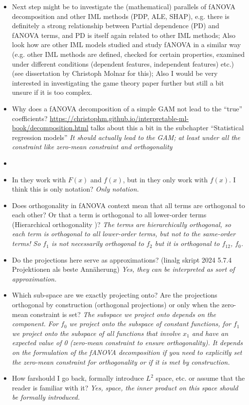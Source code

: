 \begin{itemize}
    \item Next step might be to investigate the (mathematical) parallels of fANOVA decomposition and other IML methods (PDP, ALE, SHAP), e.g. there is definitely a strong relationship between Partial dependence (PD) and fANOVA terms, and PD is itself again related to other IML methods; Also look how are other IML models studied and study fANOVA in a similar way (e.g. other IML methods are defined, checked for certain properties, examined under different conditions (dependent features, independent features) etc.) (see dissertation by Christoph Molnar for this); Also I would be very interested in investigating the game theory paper further \citep{fumagalli2025} but still a bit unsure if it is too complex.
    \item Why does a fANOVA decomposition of a simple GAM not lead to the ``true'' coefficients? \href{https://christophm.github.io/interpretable-ml-book/decomposition.html}{https://christophm.github.io/interpretable-ml-book/decomposition.html} talks about this a bit in the subchapter ``Statistical regression models'' \textit{It should actually lead to the GAM; at least under all the constraint like zero-mean constraint and orthogonality}
    \item 
    \item In \cite{hooker2004} they work with $F(x)$ and $f(x)$, but in \cite{sobol2001} they only work with $f(x)$. I think this is only notation? \textit{Only notation.}
    \item Does orthogonality in fANOVA context mean that all terms are orthogonal to each other? Or that a term is orthogonal to all lower-order terms (\ldq Hierarchical orthogonality \rdq)? \textit{The terms are hierarchically orthogonal, so each term is orthogonal to all lower-order terms, but not to the same-order terms! So $f_1$ is not necessarily orthogonal to $f_2$ but it is orthogonal to $f_{12}$, $f_{0}$.} 
    \item Do the projections here serve as approximations? (linalg skript 2024 5.7.4 Projektionen als beste Annäherung) \textit{Yes, they can be interpreted as sort of approximation.}
    \item Which sub-space are we exactly projecting onto? Are the projections orthogonal by construction (orthogonal projections) or only when the zero-mean constraint is set? \textit{The subspace we project onto depends on the component. For $f_0$ we project onto the subspace of constant functions, for $f_1$ we project onto the subspace of all functions that involve $x_1$ and have an expected value of 0 (zero-mean constraint to ensure orthogonality). It depends on the formulation of the fANOVA decomposition if you need to explicitly set the zero-mean constraint for orthogonality or if it is met by construction.}
    \item How \ldq far\rdq should I go back, formally introduce $L^2$ space, etc. or assume that the reader is familiar with it? \textit{Yes, space, the inner product on this space should be formally introduced.}
\end{itemize}


